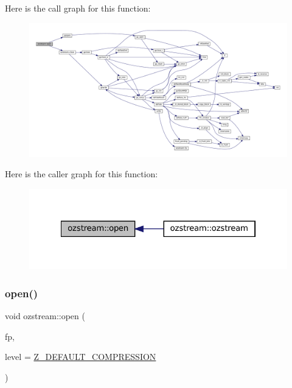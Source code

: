 Here is the call graph for this function\+:
\nopagebreak
\begin{figure}[H]
\begin{center}
\leavevmode
\includegraphics[width=350pt]{classozstream_aea598e6f8f3bb1ffff903546d98b14f0_cgraph}
\end{center}
\end{figure}
Here is the caller graph for this function\+:
\nopagebreak
\begin{figure}[H]
\begin{center}
\leavevmode
\includegraphics[width=322pt]{classozstream_aea598e6f8f3bb1ffff903546d98b14f0_icgraph}
\end{center}
\end{figure}
\mbox{\label{classozstream_aa5ccfff4546c31dd1f9cd78ad02d446f}} 
\subsubsection{\texorpdfstring{open()}{open()}\hspace{0.1cm}{\footnotesize\ttfamily [2/2]}}
{\footnotesize\ttfamily void ozstream\+::open (\begin{DoxyParamCaption}\item[{F\+I\+LE $\ast$}]{fp,  }\item[{\mbox{\hyperlink{ioapi_8h_a787fa3cf048117ba7123753c1e74fcd6}{int}}}]{level = {\ttfamily \mbox{\hyperlink{zlib_8h_af5387baee05124298e431ebe6fe96b17}{Z\+\_\+\+D\+E\+F\+A\+U\+L\+T\+\_\+\+C\+O\+M\+P\+R\+E\+S\+S\+I\+ON}}} }\end{DoxyParamCaption})\hspace{0.3cm}{\ttfamily [inline]}}

